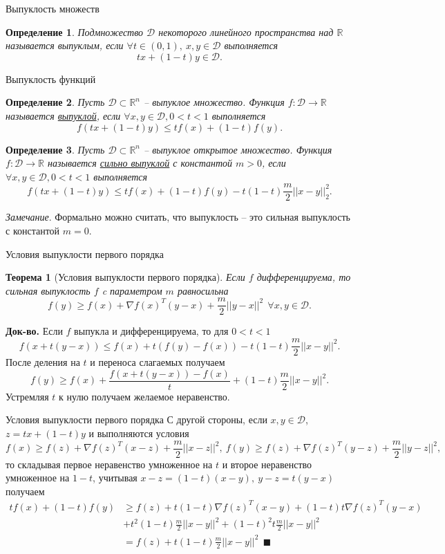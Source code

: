 \documentclass[10pt, handout]{beamer}
\newtheorem{theorem_ru}{Теорема}[]
\newtheorem{definition_ru}{Определение}[]
\begin{document}
\begin{frame}{Выпуклость множеств}
\begin{definition_ru}
Подмножество $\mathcal{D}$ некоторого линейного пространства над $\mathbb{R}$ называется выпуклым, если $\forall t\in (0, 1),~x, y\in \mathcal{D}$ выполняется
$$
tx+(1-t)y\in \mathcal{D}.
$$
\end{definition_ru}
\end{frame}

\begin{frame}{Выпуклость функций}
\begin{definition_ru}
Пусть $\mathcal{D}\subset \mathbb{R}^n$ -- выпуклое множество. Функция $f:\mathcal{D}\rightarrow\mathbb{R}$ называется \underline{выпуклой}, если $\forall x, y\in \mathcal{D}, 0<t<1$ выполняется
$$
f(tx+(1-t)y)\leq tf(x)+(1-t)f(y).
$$
\end{definition_ru}
\pause
\begin{definition_ru}
Пусть $\mathcal{D}\subset \mathbb{R}^n$ -- выпуклое открытое множество. Функция $f:\mathcal{D}\rightarrow\mathbb{R}$ называется \underline{сильно выпуклой} с константой $m>0$, если $\forall x, y\in \mathcal{D}, 0<t<1$ выполняется
$$
f(tx+(1-t)y)\leq tf(x)+(1-t)f(y)-t(1-t)\frac{m}{2}||x-y||^2_2.
$$
\end{definition_ru}
\pause
\textit{Замечание}. Формально можно считать, что выпуклость -- это сильная выпуклость с константой $m=0$.
\end{frame}

\begin{frame}{Условия выпуклости первого порядка}
\begin{theorem_ru}[Условия выпуклости первого порядка]
Если $f$ дифференцируема, то сильная выпуклость $f$ c параметром $m$ равносильна
$$
f(y)\geq f(x)+\nabla f(x)^T(y - x)+
\frac{m}{2}||y-x||^2~~\forall x, y\in\mathcal{D}.
$$
\end{theorem_ru}
\pause
\textbf{Док-во.} Если $f$ выпукла и дифференцируема, то для $0<t<1$
$$
f(x+t(y-x))\leq f(x)+t(f(y)-f(x))-t(1-t)\frac{m}{2}||x-y||^2.
$$
\pause
После деления на $t$ и переноса слагаемых получаем
$$
f(y)\geq f(x)+\frac{f(x+t(y-x))-f(x)}{t}+(1-t)\frac{m}{2}||x-y||^2.
$$
\pause
Устремляя $t$ к нулю получаем желаемое неравенство.
\end{frame}

\begin{frame}{Условия выпуклости первого порядка}
С другой стороны, если $x, y\in \mathcal{D}$, $z=tx+(1-t)y$ и выполняются условия
$$
f(x)\geq f(z)+\nabla f(z)^T(x - z)+\frac{m}{2}||x-z||^2,~f(y)\geq f(z)+\nabla f(z)^T(y - z)+\frac{m}{2}||y-z||^2,
$$
то складывая первое неравенство умноженное на $t$ и второе неравенство умноженное на $1-t$, учитывая $x-z=(1-t)(x-y),~y-z=t(y-x)$ получаем
\begin{align*}
tf(x)+(1-t)f(y)&\geq f(z)+t(1-t)\nabla f(z)^T(x-y)+(1-t)t\nabla f(z)^T(y-x)\\
&+t^2(1-t)\frac{m}{2}||x-y||^2+(1-t)^2t\frac{m}{2}||x-y||^2\\
&=f(z)+t(1-t)\frac{m}{2}||x-y||^2~~\blacksquare
\end{align*}

\end{frame}
\end{document}
